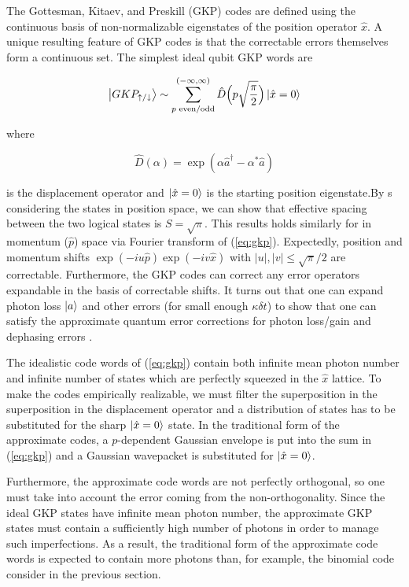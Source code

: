 \documentclass[12]{amsart}
\newcommand\0{\mathbf{0}}
\newcommand\<{\langle}
\renewcommand\>{\rangle}
\begin{document}
The Gottesman, Kitaev, and Preskill (GKP) codes \cite{gottesman2001encoding} are defined using the continuous basis of non-normalizable eigenstates of the position operator $\hat{x}$. A unique resulting feature of GKP codes is that the correctable errors themselves form a continuous set. The simplest ideal qubit GKP words are

\begin{align}
\label{eq:gkp}
\ket{GKP_{\uparrow/\downarrow}} \sim \sum_{p\text{ even/odd}}^{(-\infty, \infty)} \hat{D}\Big(p \sqrt{\frac{\pi}{2}} \Big) \ket{\hat{x} = 0} 	
\end{align}


  where 
  
  $$\hat{D}(\alpha) = \exp(\alpha \hat{a}^\dag - \alpha^* \hat{a})$$
  
  is the displacement operator and $\ket{\hat{x} = 0}$ is the starting position eigenstate.By s considering the states in position space, we can show that effective spacing between the two logical states is $S=\sqrt{\pi}$. This results holds similarly for in momentum ($\hat{p}$) space via Fourier transform of (\ref{eq:gkp}). Expectedly, position and momentum shifts $\exp(-iu\hat{p})\exp(-iv\hat{x})$ with $|u|, |v| \leq \sqrt{\pi}/2$ are correctable. Furthermore, the GKP codes can correct any error operators expandable in the basis of correctable shifts. It turns out that one can expand photon loss $\ket{a}$ and other errors (for small enough $\kappa \delta t$) to show that one can satisfy the approximate quantum error corrections for photon loss/gain and dephasing errors \cite{michael2016new}.
  
The idealistic code words of (\ref{eq:gkp}) contain both infinite mean photon number and infinite number of states which are perfectly squeezed in the $\hat{x}$ lattice. To make the codes empirically realizable, we must filter the superposition in the superposition in the displacement operator and a distribution of states has to be substituted for the sharp $\ket{\hat{x}=0}$ state. In the traditional form of the approximate codes, a $p$-dependent Gaussian envelope is put into the sum in (\ref{eq:gkp}) and a Gaussian wavepacket is substituted for $\ket{\hat{x}=0}$. 

Furthermore, the approximate code words are not perfectly orthogonal, so one must take into account the error coming from the non-orthogonality. Since the ideal GKP states have infinite mean photon number, the approximate GKP states must contain a sufficiently high number of photons in order to manage such imperfections. As a result, the traditional form of the approximate code words is expected to contain more photons than, for example, the binomial code consider in the previous section.
\end{document}
